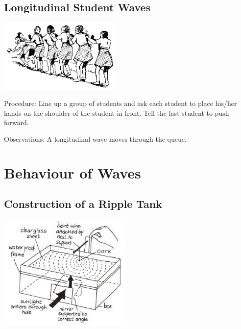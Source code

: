 \begin{multicols}{2}
\subsection{Longitudinal Student Waves}

\begin{center}
\includegraphics[width=0.45\textwidth]{./img/source/longitudinal-waves.png}
\end{center}

\begin{description*}
\item[Procedure:]{Line up a group of students and ask each student to place his/her hands on the shoulder of the student in front. Tell the last student to push forward.}
\item[Observations:]{A longitudinal wave moves through the queue.}
\end{description*}


\section*{Behaviour of Waves}


\subsection{Construction of a Ripple Tank}

\begin{center}
\includegraphics[width=0.49\textwidth]{./img/vso/ripple-tank.jpg}
\end{center}


\end{multicols}
